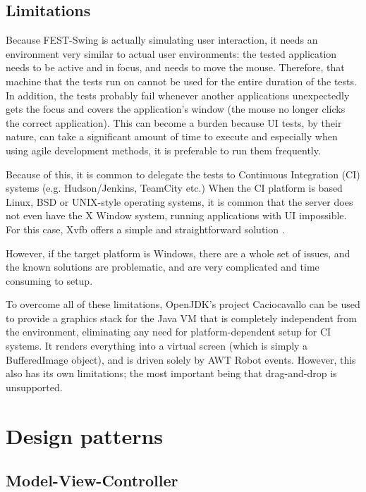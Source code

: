 \subsection{Limitations}\label{sec:fest-swing-limitations}

Because FEST-Swing is actually simulating user interaction, it needs an environment very similar to actual user environments: the tested application needs to be active and in focus, and needs to move the mouse. Therefore, that machine that the tests run on cannot be used for the entire duration of the tests. In addition, the tests probably fail whenever another applications unexpectedly gets the focus and covers the application's window (the mouse no longer clicks the correct application). This can become a burden because UI tests, by their nature, can take a significant amount of time to execute and especially when using agile development methods, it is preferable to run them frequently.

Because of this, it is common to delegate the tests to Continuous Integration (CI) systems (e.g. Hudson/Jenkins, TeamCity etc.) When the CI platform is based Linux, BSD or UNIX-style operating systems, it is common that the server does not even have the X Window system, running applications with UI impossible. For this case, Xvfb offers a simple and straightforward solution \cite{FESTxvfb}.

However, if the target platform is Windows, there are a whole set of issues, and the known solutions are problematic, and are very complicated and time consuming to setup. \cite{HudsonUnderWindows} \cite{Cacio_Tta_FEST}

To overcome all of these limitations, OpenJDK's project Caciocavallo can be used \cite{Cacio_Tta_FEST} to provide a graphics stack for the Java VM that is completely independent from the environment, eliminating any need for platform-dependent setup for CI systems. It renders everything into a virtual screen (which is simply a BufferedImage object), and is driven solely by AWT Robot events. However, this also has its own limitations; the most important being that drag-and-drop  is unsupported.

\section{Design patterns}\label{sec:theory_design-patterns}

\subsection{Model-View-Controller}\label{sec:model-view-controller}

